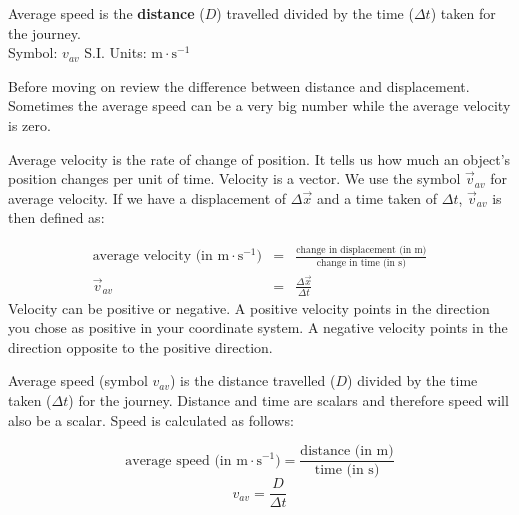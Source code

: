  {Average speed is the \textbf{distance} ($D$) travelled divided by the time ($\Delta t$) taken for the journey.\\
Symbol: $v_{av}$\hspace{2cm} S.I. Units: $\text{m}\cdot \text{s}^{-1}$} 



Before moving on review the difference between distance and displacement. Sometimes the average speed can be a very big number while the average velocity is zero.


      \label{m38791*id64258}Average velocity is the rate of change of position. It tells us how much an object's position changes per unit of  time. Velocity is a vector. We use the symbol $\vec{v}_{av}$ for average velocity. If we have a displacement of $\Delta \vec{x}$ and a time taken of $\Delta t$, $\vec{v}_{av}$ is then defined as:\par 
      \label{m38791*id64307}\nopagebreak\noindent{}
\begin{eqnarray*}
\text{average velocity (in m} \cdot \text{s}^{-1}) &=& \frac{\text{change in displacement (in m)}}{\text{change in time (in s)}}\\
\vec{v}_{av} &=& \frac{\Delta \vec{x}}{\Delta t}
\end{eqnarray*}\label{eq:pr:velocity}
      \label{m38791*id64460}Velocity can be positive or negative. A positive velocity points in the direction you chose as positive in your coordinate system. A negative velocity points in the direction opposite to the positive direction.

Average speed (symbol $v_{av}$) is the distance travelled ($D$) divided by the time taken ($\Delta t$) for the journey. Distance and time are scalars and therefore speed will also be a scalar. Speed is calculated as follows:\par 
      \label{m38791*id64549}\nopagebreak\noindent{}
        
    \begin{equation*}
    \text{average speed (in m} \cdot {\text{s}}^{-1}\text{)}  =  \frac{\text{distance (in m)}}{\text{time (in s)}} 
      \end{equation*}
      \label{m38791*id64639}\nopagebreak\noindent{}
    \begin{equation*}
    v_{av}=\frac{D}{\Delta t}
      \end{equation*}
      
